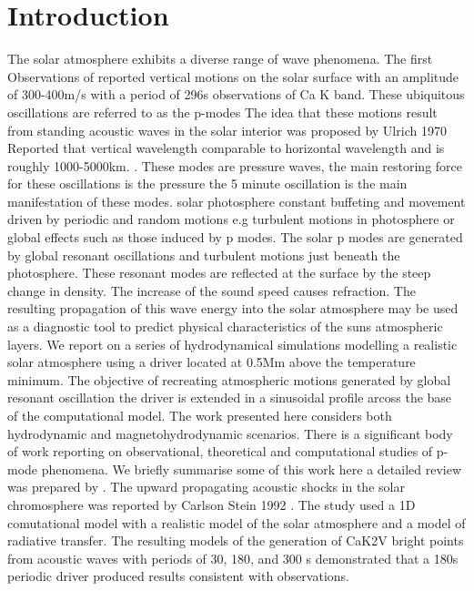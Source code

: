 \documentclass{aa}
\begin{document}
\section{Introduction}

The solar atmosphere exhibits a diverse range of wave phenomena. The first Observations of \cite{Leighton1960}  reported vertical motions on the solar surface with an amplitude of 300-400m/s with a period of 296s observations of Ca K band. These ubiquitous oscillations are referred to as the p-modes
The idea that these motions result from standing acoustic waves in the solar interior was proposed by Ulrich 1970  \cite{Ulrich1970} Reported that vertical wavelength comparable to horizontal wavelength and is roughly 1000-5000km.    \cite{Leibacher1971}.  These modes are pressure waves, the main restoring force for these oscillations is the pressure the 5 minute oscillation is the main manifestation of these modes. solar photosphere constant buffeting and movement driven by periodic and random motions e.g turbulent motions in photosphere or global effects such as those induced by p modes. The solar p modes are generated by global resonant oscillations and turbulent motions just beneath the photosphere.  These resonant modes are reflected at the surface by the steep change in density. The increase of the sound speed causes refraction.   The resulting propagation of this wave energy into the solar atmosphere may be used as a diagnostic tool to predict  physical characteristics of the  suns atmospheric layers. We report on a series of hydrodynamical simulations modelling a realistic solar atmosphere using a driver located at 0.5Mm above the temperature minimum. The objective of recreating atmospheric motions generated by global resonant oscillation the driver is extended in a sinusoidal profile arcoss the base of the computational model. The work presented here considers both hydrodynamic and magnetohydrodynamic scenarios. There is a significant body of work reporting on observational, theoretical and computational studies of p-mode phenomena. We briefly summarise some of this work here a detailed review was prepared by \cite{Khomenko2013}. The upward propagating acoustic shocks in the solar chromosphere was reported by Carlson Stein 1992  \cite{Carlsson1992}. The study used a 1D comutational model with a realistic model of the solar atmosphere and a model of radiative transfer. The resulting models of the generation of CaK2V bright points from acoustic waves with periods of 30, 180, and 300 s demonstrated that a 180s periodic driver produced results consistent with observations.
\end{document}
